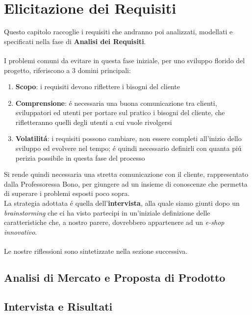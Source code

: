 \documentclass{article}
\begin{document}
	\section{Elicitazione dei Requisiti}
	Questo capitolo raccoglie i requisiti che andranno poi analizzati, modellati e specificati nella fase di \textbf{Analisi dei Requisiti}. 
	\\
	\\
	I problemi comuni da evitare in questa fase iniziale, per uno sviluppo florido del progetto, riferiscono a 3 domini principali:
	\begin{enumerate}
		\item \textbf{Scopo}: i requisiti devono riflettere i bisogni del cliente
		\item \textbf{Comprensione}: \'e necessaria una buona comunicazione tra clienti, sviluppatori ed utenti per portare sul pratico i bisogni del cliente, che rifletteranno quelli degli utenti a cui vuole rivolgersi
		\item \textbf{Volatilit\'a}: i requisiti possono cambiare, non essere completi all'inizio dello sviluppo ed evolvere nel tempo; \'e quindi necessario definirli con quanta pi\'u perizia possibile in questa fase del processo
	\end{enumerate}
	
	Si rende quindi necessaria una stretta comunicazione con il cliente, rappresentato dalla Professoressa Bono, per giungere ad un insieme di conoscenze che permetta di superare i problemi esposti poco sopra. \\
	La strategia adottata \'e quella dell'\textbf{intervista}, alla quale siamo giunti dopo un \textit{brainstorming} che ci ha visto partecipi in un'iniziale definizione delle caratteristiche che, a nostro parere, dovrebbero appartenere ad un \textit{e-shop innovativo}.
	\\
	\\
	Le nostre riflessioni sono sintetizzate nella sezione successiva. 
	
	\subsection{Analisi di Mercato e Proposta di Prodotto} 
	
	\subsection{Intervista e Risultati}
	
	\newpage
	
	
	
	
	
\end{document}
